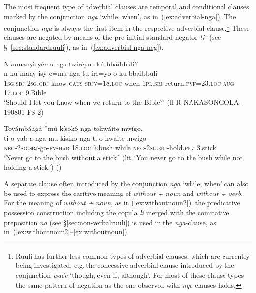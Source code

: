 \documentclass[output=paper,colorlinks,citecolor=brown,draftmode]{langscibook}
\begin{document}
The most frequent type of adverbial clauses are temporal and conditional clauses marked by the conjunction \textit{nga} `while, when', as in~(\ref{ex:adverbial-nga}). 
The conjunction \textit{nga} is always the first item in the respective adverbial clause.\footnote{Ruuli has further less common types of adverbial clauses, which are currently being investigated, e.g.\,the concessive adverbial clause introduced by the conjunction \emph{wade} `though, even if, although'. For most of these clause types the same pattern of negation as the one observed with \emph{nga}-clauses holds.} 
These clauses are negated by means of the pre-initial standard negator \emph{ti-} (see §~\ref{sec:standardruuli}), as in~(\ref{ex:adverbial-nga-neg}).

\ea \label{ex:adverbialclause}\label{ex:ruulietal:28}
\begin{xlist}
\ex \label{ex:adverbial-nga}\label{ex:ruulietal:28a}
    \glll   Nkumanyisyémú nga twiréyo okú bbáíbbúli?\\
        n-ku-many-isy-e=mu			nga	tu-ire=yo			o-ku		bbaibbuli\\
        1\textsc{sg.sbj}-2\textsc{sg.obj}-know-\textsc{caus}-\textsc{sbjv}=18.\textsc{loc}	when	1\textsc{pl.sbj}-return.\textsc{pvf}=23.\textsc{loc}	\textsc{aug}-17.\textsc{loc}	9.Bible\\
    \glt `Should I let you know when we return to the Bible?' (ll-R-NAKASONGOLA-190801-FS-2)

\ex \label{ex:adverbial-nga-neg}\label{ex:ruulietal:28b}
    \glll Toyámbángá ꜜmú kísokô nga tokwáite mwígo.\\
         ti-o-yab-a-nga mu kisiko nga ti-o-kwaite 	        	mwigo\\
	   \textsc{neg}-2\textsc{sg.sbj}-go-\textsc{fv-hab} 18.\textsc{loc}	7.bush	while \textsc{neg}-2\textsc{sg.sbj}-hold.\textsc{pfv} 3.stick\\
	\glt ‘Never go to the bush without a stick.’ (lit.\,‘You never go to the bush while not holding a stick.’) (\citealt[62]{NamyaloEtAl2021})
\end{xlist}
\z

A separate clause often introduced by the conjunction \textit{nga} `while, when' can also be used to express the caritive meaning of \textit{without + noun} and \textit{without + verb}.
For the meaning of \textit{without + noun}, as in (\ref{ex:withoutnoun2}), the predicative possession construction including the copula \textit{li} merged with the comitative preposition \textit{na} (see §\ref{sec:non-verbalruuli}) is used in the \textit{nga}-clause, as in~(\ref{ex:withoutnoun2}--\ref{ex:withoutnoun}).
\end{document}
